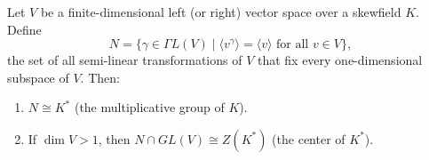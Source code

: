 Let $V$ be a finite-dimensional left (or right) vector space over a skewfield $K$. Define
$$N = \{\gamma \in \Gamma L(V) \mid \langle v^\gamma \rangle = \langle v \rangle \text{ for all } v \in V\},$$
the set of all semi-linear transformations of $V$ that fix every one-dimensional subspace of $V$. Then:
\begin{enumerate}
\item $N \cong K^*$ (the multiplicative group of $K$).
\item If $\dim V > 1$, then $N \cap GL(V) \cong Z(K^*)$ (the center of $K^*$).
\end{enumerate}

